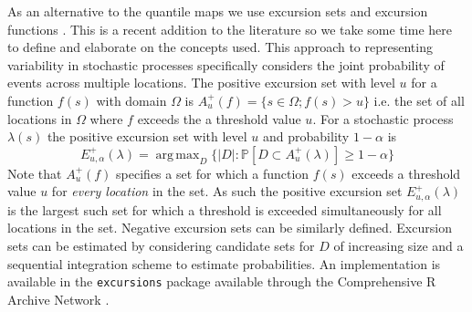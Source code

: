 \documentclass[preprint,12pt]{elsarticle}
\DeclareMathOperator*{\argmax}{arg\,max}  %
\begin{document}
As an alternative to the quantile maps we use excursion sets and excursion functions \citep{bolin_excursion_2015}.  This is a recent addition to the literature so we take some time here to define and elaborate on the concepts used.  This approach to representing variability in stochastic processes specifically considers the joint probability of events across multiple locations.  The positive excursion set with level $u$ for a function $f(s)$ with domain $\Omega$ is $A_u^{+}(f) = \{ s \in \Omega ; f(s) > u \}$ i.e. the set of all locations in $\Omega$ where $f$ exceeds the a threshold value $u$. For a stochastic process $\lambda(s)$ the positive excursion set with level $u$ and probability $1 - \alpha$ is
%
\begin{equation*}
E_{u,\alpha}^{+}(\lambda) = \argmax_{D}\{\lvert D \rvert : \mathbb{P}\left[D \subset A_u^{+}(\lambda)\right] \geq 1 - \alpha \}
\end{equation*}
Note that $A_u^{+}(f)$ specifies a set for which a function $f(s)$ exceeds a threshold value $u$ for \textit{every location} in the set.  As such the positive excursion set $E_{u,\alpha}^{+}(\lambda)$ is the largest such set for which a threshold is exceeded simultaneously for all locations in the set.  Negative excursion sets can be similarly defined.  Excursion sets can be estimated by considering candidate sets for $D$ of increasing size and a sequential integration scheme to estimate probabilities.  An implementation is available in the \texttt{excursions} package \citep{bolin_calculating_2018} available through the Comprehensive R Archive Network \citep{r_2017}.
\end{document}
